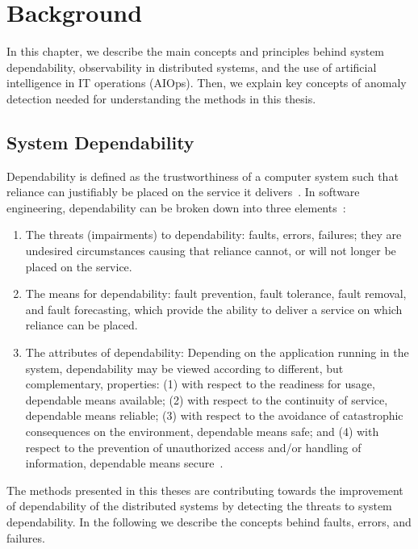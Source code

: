 \chapter{Background}\label{ch:background} %
\minitoc%
\bigskip

In this chapter, we describe the main concepts and principles behind system dependability, observability in distributed systems, and the use of artificial intelligence in IT operations (AIOps). Then, we explain key concepts of anomaly detection needed for understanding the methods in this thesis. 

\section{System Dependability}
Dependability is defined as the trustworthiness of a computer system such that reliance can justifiably be placed on the service it delivers~\cite{carter1982time}. In software engineering, dependability can be broken down into three elements~\cite{Laprie1992}:
\begin{enumerate}
    \item The threats (impairments) to dependability: faults, errors, failures; they are
undesired circumstances causing that reliance cannot, or will not longer be placed on the service.
    \item The means for dependability: fault prevention, fault tolerance, fault
removal, and fault forecasting, which provide the ability to deliver a service on which
reliance can be placed.
    \item The attributes of dependability: Depending on the application running in the system, dependability may be viewed according to different, but complementary, properties: (1) with respect to the readiness for usage, dependable means available; (2) with respect to the continuity of service, dependable means reliable; (3) with respect to the avoidance of catastrophic consequences on the environment, dependable means safe; and (4) with respect to the prevention of unauthorized access and/or handling of information, dependable means secure~\cite{Laprie1992}. 
\end{enumerate}

The methods presented in this theses are contributing towards the improvement of dependability of the distributed systems by detecting the threats to system dependability. In the following we describe the concepts behind faults, errors, and failures.

